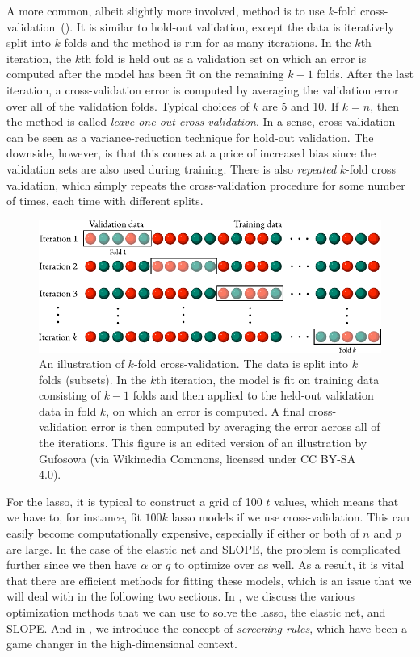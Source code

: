 A more common, albeit slightly more involved, method is to use \(k\)-fold cross-validation~(). It is similar to hold-out validation, except the data is iteratively split into \(k\) folds and the method is run for as many iterations. In the \(k\)th iteration, the \(k\)th fold is held out as a validation set on which an error is computed after the model has been fit on the remaining \(k-1\) folds. After the last iteration, a cross-validation error is computed by averaging the validation error over all of the validation folds. Typical choices of \(k\) are 5 and 10. If \(k=n\), then the method is called \emph{leave-one-out cross-validation}. In a sense, cross-validation can be seen as a variance-reduction technique for hold-out validation. The downside, however, is that this comes at a price of increased bias since the validation sets are also used during training. There is also \emph{repeated} \(k\)-fold cross validation, which simply repeats the cross-validation procedure for some number of times, each time with different splits.

\begin{figure}[htpb]
  \centering
  \includegraphics[width=\textwidth]{figures/kfold-cv.pdf}
  \caption{%
    An illustration of \(k\)-fold cross-validation. The data is split into \(k\) folds (subsets). In the \(k\)th iteration, the model is fit on training data consisting of \(k-1\) folds and then applied to the held-out validation data in fold \(k\), on which an error is computed. A final cross-validation error is then computed by averaging the error across all of the iterations.
    This figure is an edited version of an illustration by Gufosowa (via Wikimedia Commons, licensed under CC BY-SA 4.0).
  }
  \label{fig:k-fold-cv}
\end{figure}

For the lasso, it is typical to construct a grid of 100 \(t\) values, which means that we have to, for instance, fit \(100k\) lasso models if we use cross-validation. This can easily become computationally expensive, especially if either or both of \(n\) and \(p\) are large. In the case of the elastic net and SLOPE, the problem is complicated further since we then have \(\alpha\) or \(q\) to optimize over as well. As a result, it is vital that there are efficient methods for fitting these models, which is an issue that we will deal with in the following two sections. In , we discuss the various optimization methods that we can use to solve the lasso, the elastic net, and SLOPE. And in , we introduce the concept of \emph{screening rules}, which have been a game changer in the high-dimensional context.

